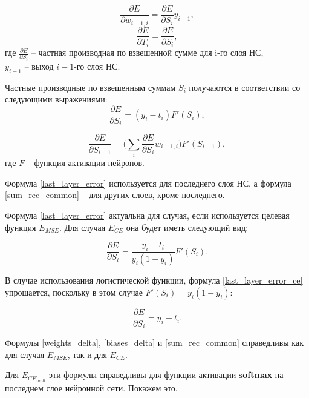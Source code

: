 \begin{equation}
	\label{weights_delta}
	\frac{\partial E}{\partial w_{i-1, i}} = \frac{\partial E}{\partial S_i} y_{i-1},
\end{equation}
\begin{equation}
	\label{biases_delta}
	\frac{\partial E}{\partial T_i} = \frac{\partial E}{\partial S_i},
\end{equation}
где $\frac{\partial E}{\partial S_i}$ -- частная производная по взвешенной сумме для i-го слоя НС,\\
$y_{i-1}$ -- выход $i-1$-го слоя НС.


Частные производные по взвешенным суммам $S_i$ получаются в соответствии со следующими выражениями:
\begin{equation}
	\label{last_layer_error}
	\frac{\partial E}{\partial S_i} = (y_i - t_i)F'(S_i),
\end{equation}

\begin{equation}
	\label{sum_rec_common}
	\frac{\partial E}{\partial S_{i-1}} = \Bigg(\sum_{i}\frac{\partial E}{\partial S_i}w_{i-1, i}\Bigg)F'(S_{i-1}),
\end{equation}
где $F$ -- функция активации нейронов.

Формула \ref{last_layer_error} используется для последнего слоя НС, а формула \ref{sum_rec_common} -- для других слоев, кроме последнего.

Формула \ref{last_layer_error} актуальна для случая, если используется целевая функция $E_{MSE}$. Для случая $E_{CE}$ она будет иметь следующий вид:

\begin{equation}
	\label{last_layer_error_ce}
	\frac{\partial E}{\partial S_i} = \frac{y_i - t_i}{y_i(1-y_i)}F'(S_i).
\end{equation}

В случае использования логистической функции, формула \ref{last_layer_error_ce} упрощается, поскольку в этом случае $F'(S_i)=y_i(1-y_i)$:

\begin{equation}
	\frac{\partial E}{\partial S_i} = y_i - t_i.
\end{equation}

Формулы \ref{weights_delta}, \ref{biases_delta} и \ref{sum_rec_common} справедливы как для случая $E_{MSE}$, так и для $E_{CE}$.

Для $E_{CE_{mult}}$ эти формулы справедливы для функции активации \textbf{softmax} на последнем слое нейронной сети. Покажем это.

